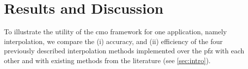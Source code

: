 \documentclass[preprint,12pt]{elsarticle}
\begin{document}

    
        
    

\section{Results and Discussion} \label{sec:results}

To illustrate the utility of the \gls{cmo} framework for one application, namely interpolation, we compare the (i) accuracy, and (ii) efficiency of the four previously described interpolation methods implemented over the \gls{pfz} with each other and with existing methods from the literature (see \cref{sec:intro}).
\end{document}
